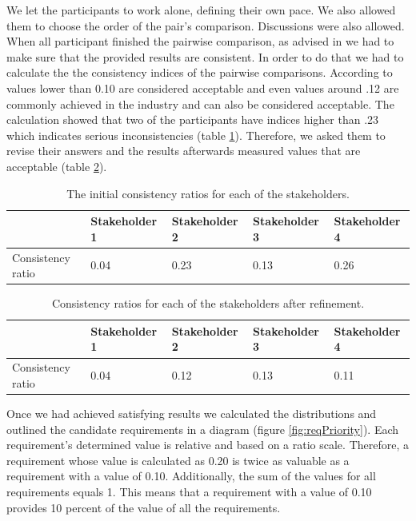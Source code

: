 We let the participants to work alone, defining their own pace. We also allowed them to choose the order of the pair's comparison. Discussions were also allowed. When all participant finished the pairwise comparison, as advised in \cite{karlsson1997cost} we had to make sure that the provided results are consistent. In order to do that we had to calculate the the consistency indices of the pairwise comparisons. According to \cite{karlsson1997cost} values lower than 0.10 are considered acceptable and even values around .12 are commonly achieved in the industry and can also be considered acceptable. The calculation showed that two of the participants have indices higher than .23 which indicates serious inconsistencies (table \ref{tbl:reqInitialConsist}). Therefore, we asked them to revise their answers and the results afterwards measured values that are acceptable (table \ref{tbl:reqFinalConsist}).
 
 \begin{table}[h!]
  \begin{center}
    \begin{tabular}{| l | l | l | l | l |}
    \hline
    & Stakeholder 1 & Stakeholder 2 & Stakeholder 3 & Stakeholder 4 \\	 \hline
    Consistency ratio & 0.04 & 0.23 & 0.13 & 0.26 \\
    \hline
    \end{tabular}
  \end{center}
  \caption{The initial consistency ratios for each of the stakeholders.}
  \label{tbl:reqInitialConsist}
\end{table}


 \begin{table}[h!]
  \begin{center}
    \begin{tabular}{| l | l | l | l | l |}
    \hline
    & Stakeholder 1 & Stakeholder 2 & Stakeholder 3 & Stakeholder 4 \\	 \hline
    Consistency ratio & 0.04 & 0.12 & 0.13 & 0.11 \\
    \hline
    \end{tabular}
  \end{center}
  \caption{Consistency ratios for each of the stakeholders after refinement.}
  \label{tbl:reqFinalConsist}
\end{table}

Once we had achieved satisfying results we calculated the distributions and outlined the candidate requirements in a diagram (figure \ref{fig:reqPriority}). Each requirement's determined value is relative and based on a ratio scale. Therefore, a requirement whose value is calculated as 0.20 is twice as valuable as a requirement with a value of 0.10. Additionally, the sum of the values for all requirements equals 1. This means that a requirement with a value of 0.10 provides 10 percent of the value of all the requirements.

